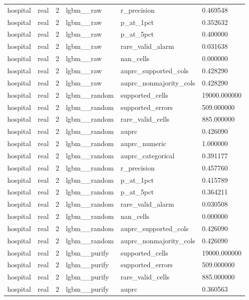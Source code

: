 \begin{tabular}{llllll}
hospital & real & 2 & lgbm\_\_raw & r\_precision & 0.469548 \\
hospital & real & 2 & lgbm\_\_raw & p\_at\_1pct & 0.352632 \\
hospital & real & 2 & lgbm\_\_raw & p\_at\_5pct & 0.400000 \\
hospital & real & 2 & lgbm\_\_raw & rare\_valid\_alarm & 0.031638 \\
hospital & real & 2 & lgbm\_\_raw & nan\_cells & 0.000000 \\
hospital & real & 2 & lgbm\_\_raw & auprc\_supported\_cols & 0.428290 \\
hospital & real & 2 & lgbm\_\_raw & auprc\_nonmajority\_cols & 0.428290 \\
hospital & real & 2 & lgbm\_\_random & supported\_cells & 19000.000000 \\
hospital & real & 2 & lgbm\_\_random & supported\_errors & 509.000000 \\
hospital & real & 2 & lgbm\_\_random & rare\_valid\_cells & 885.000000 \\
hospital & real & 2 & lgbm\_\_random & auprc & 0.426090 \\
hospital & real & 2 & lgbm\_\_random & auprc\_numeric & 1.000000 \\
hospital & real & 2 & lgbm\_\_random & auprc\_categorical & 0.391177 \\
hospital & real & 2 & lgbm\_\_random & r\_precision & 0.457760 \\
hospital & real & 2 & lgbm\_\_random & p\_at\_1pct & 0.415789 \\
hospital & real & 2 & lgbm\_\_random & p\_at\_5pct & 0.364211 \\
hospital & real & 2 & lgbm\_\_random & rare\_valid\_alarm & 0.030508 \\
hospital & real & 2 & lgbm\_\_random & nan\_cells & 0.000000 \\
hospital & real & 2 & lgbm\_\_random & auprc\_supported\_cols & 0.426090 \\
hospital & real & 2 & lgbm\_\_random & auprc\_nonmajority\_cols & 0.426090 \\
hospital & real & 2 & lgbm\_\_purify & supported\_cells & 19000.000000 \\
hospital & real & 2 & lgbm\_\_purify & supported\_errors & 509.000000 \\
hospital & real & 2 & lgbm\_\_purify & rare\_valid\_cells & 885.000000 \\
hospital & real & 2 & lgbm\_\_purify & auprc & 0.360563 \\

\end{tabular}
